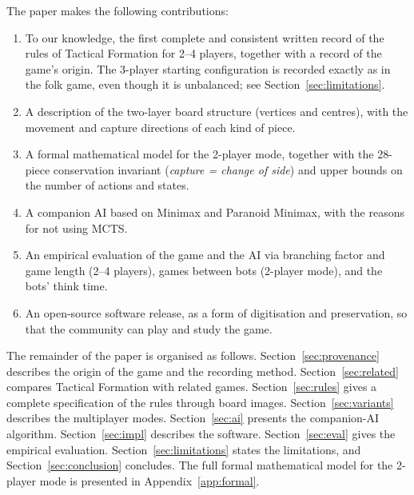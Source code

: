 The paper makes the following contributions:
\begin{enumerate}[label=(\roman*)]
  \item To our knowledge, the first complete and consistent written record
        of the rules of Tactical Formation for 2--4 players, together with a record of
        the game's origin. The 3-player starting configuration is recorded
        exactly as in the folk game, even though it is unbalanced; see
        Section~\ref{sec:limitations}.
  \item A description of the two-layer board structure (vertices and
        centres), with the movement and capture directions of each kind of piece.
  \item A formal mathematical model for the 2-player mode, together with
        the 28-piece conservation invariant (\emph{capture = change of
        side}) and upper bounds on the number of actions and states.
  \item A companion AI based on Minimax and Paranoid Minimax, with the
        reasons for not using MCTS.
  \item An empirical evaluation of the game and the AI via branching
        factor and game length (2--4 players), games between bots (2-player
        mode), and the bots' think time.
  \item An open-source software release, as a form of digitisation and
        preservation, so that the community can play and study the game.
\end{enumerate}

The remainder of the paper is organised as follows.
Section~\ref{sec:provenance} describes the origin of the game and the
recording method. Section~\ref{sec:related} compares Tactical Formation with related
games. Section~\ref{sec:rules} gives a complete specification of the rules
through board images. Section~\ref{sec:variants} describes the multiplayer
modes. Section~\ref{sec:ai} presents the companion-AI algorithm.
Section~\ref{sec:impl} describes the software. Section~\ref{sec:eval}
gives the empirical evaluation. Section~\ref{sec:limitations} states the
limitations, and Section~\ref{sec:conclusion} concludes. The full formal
mathematical model for the 2-player mode is presented in
Appendix~\ref{app:formal}.
